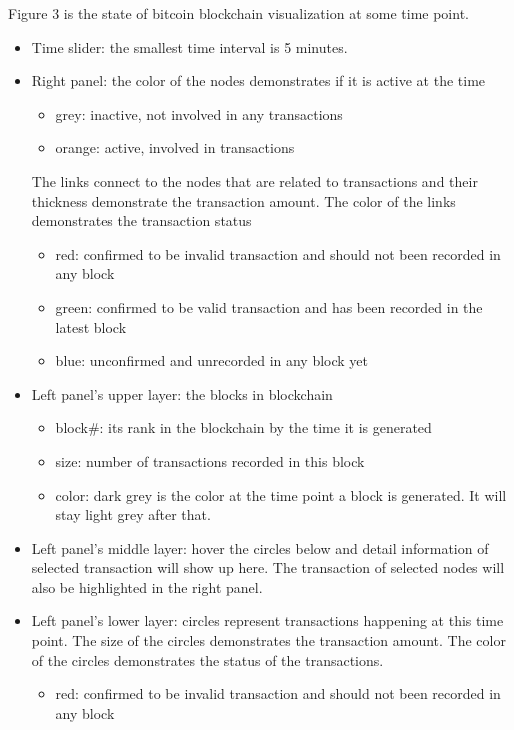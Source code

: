\documentclass[journal, a4paper]{IEEEtran}
\begin{document}
Figure 3 is the state of bitcoin blockchain visualization at some time point.
\begin{itemize}
    \item Time slider: the smallest time interval is 5 minutes.
    \item Right panel: the color of the nodes demonstrates if it is active at the time
    \begin{itemize}
        \item grey: inactive, not involved in any transactions
        \item orange: active, involved in transactions
    \end{itemize}
    The links connect to the nodes that are related to transactions and their thickness demonstrate the transaction amount. The color of the links demonstrates the transaction status
    \begin{itemize}
        \item red: confirmed to be invalid transaction and should not been recorded in any block
        \item green: confirmed to be valid transaction and has been recorded in the latest block
        \item blue: unconfirmed and unrecorded in any block yet
    \end{itemize}
    \item Left panel's upper layer: the blocks in blockchain
    \begin{itemize}
        \item block\#: its rank in the blockchain by the time it is generated
        \item size: number of transactions recorded in this block
        \item color: dark grey is the color at the time point a block is generated. It will stay light grey after that.
    \end{itemize}
    \item Left panel's middle layer: hover the circles below and detail information of selected transaction will show up here. The transaction of selected nodes will also be highlighted in the right panel.
    \item Left panel's lower layer: circles represent transactions happening at this time point. The size of the circles demonstrates the transaction amount. The color of the circles demonstrates the status of the transactions.
    \begin{itemize}
        \item red: confirmed to be invalid transaction and should not been recorded in any block

\end{itemize}
\end{itemize}
\end{document}
